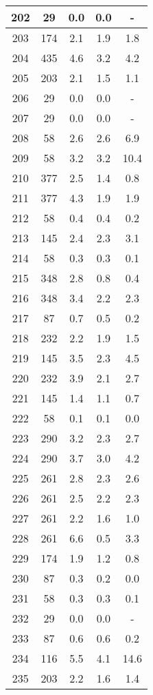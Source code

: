 \documentclass[a4paper,10pt]{article}
\begin{document}
\begin{table}
\begin{tabular}{|c|c|c|c|c|}
\hline
202 & 29 & 0.0 & 0.0 & - \\
\hline
203 & 174 & 2.1 & 1.9 & 1.8 \\
\hline
204 & 435 & 4.6 & 3.2 & 4.2 \\
\hline
205 & 203 & 2.1 & 1.5 & 1.1 \\
\hline
206 & 29 & 0.0 & 0.0 & - \\
\hline
207 & 29 & 0.0 & 0.0 & - \\
\hline
208 & 58 & 2.6 & 2.6 & 6.9 \\
\hline
209 & 58 & 3.2 & 3.2 & 10.4 \\
\hline
210 & 377 & 2.5 & 1.4 & 0.8 \\
\hline
211 & 377 & 4.3 & 1.9 & 1.9 \\
\hline
212 & 58 & 0.4 & 0.4 & 0.2 \\
\hline
213 & 145 & 2.4 & 2.3 & 3.1 \\
\hline
214 & 58 & 0.3 & 0.3 & 0.1 \\
\hline
215 & 348 & 2.8 & 0.8 & 0.4 \\
\hline
216 & 348 & 3.4 & 2.2 & 2.3 \\
\hline
217 & 87 & 0.7 & 0.5 & 0.2 \\
\hline
218 & 232 & 2.2 & 1.9 & 1.5 \\
\hline
219 & 145 & 3.5 & 2.3 & 4.5 \\
\hline
220 & 232 & 3.9 & 2.1 & 2.7 \\
\hline
221 & 145 & 1.4 & 1.1 & 0.7 \\
\hline
222 & 58 & 0.1 & 0.1 & 0.0 \\
\hline
223 & 290 & 3.2 & 2.3 & 2.7 \\
\hline
224 & 290 & 3.7 & 3.0 & 4.2 \\
\hline
225 & 261 & 2.8 & 2.3 & 2.6 \\
\hline
226 & 261 & 2.5 & 2.2 & 2.3 \\
\hline
227 & 261 & 2.2 & 1.6 & 1.0 \\
\hline
228 & 261 & 6.6 & 0.5 & 3.3 \\
\hline
229 & 174 & 1.9 & 1.2 & 0.8 \\
\hline
230 & 87 & 0.3 & 0.2 & 0.0 \\
\hline
231 & 58 & 0.3 & 0.3 & 0.1 \\
\hline
232 & 29 & 0.0 & 0.0 & - \\
\hline
233 & 87 & 0.6 & 0.6 & 0.2 \\
\hline
234 & 116 & 5.5 & 4.1 & 14.6 \\
\hline
235 & 203 & 2.2 & 1.6 & 1.4 \\

\end{tabular}
\end{table}
\end{document}
